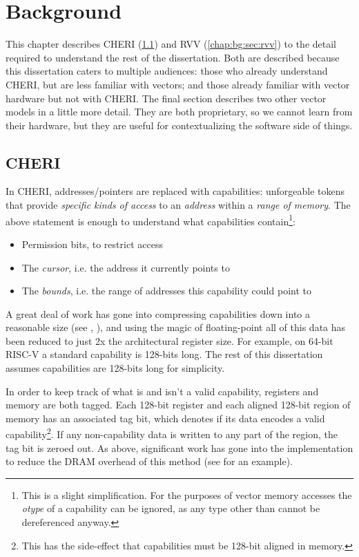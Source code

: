 \chapter{Background}

This chapter describes CHERI (\cref{chap:bg:sec:cheri}) and RVV (\cref{chap:bg:sec:rvv}) to the detail required to understand the rest of the dissertation.
Both are described because this dissertation caters to multiple audiences: those who already understand CHERI, but are less familiar with vectors; and those already familiar with vector hardware but not with CHERI.
The final section describes two other vector models in a little more detail.
They are both proprietary, so we cannot learn from their hardware, but they are useful for contextualizing the software side of things.


\section{CHERI}\label{chap:bg:sec:cheri}
In CHERI, addresses/pointers are replaced with capabilities: unforgeable tokens that provide \emph{specific kinds of access} to an \emph{address} within a \emph{range of memory}.
The above statement is enough to understand what capabilities contain\footnote{This is a slight simplification. For the purposes of vector memory accesses the \emph{otype} of a capability can be ignored, as any type other than  cannot be dereferenced anyway.}:
\begin{itemize}
    \item Permission bits, to restrict access
    \item The \emph{cursor}, i.e. the address it currently points to
    \item The \emph{bounds}, i.e. the range of addresses this capability could point to
\end{itemize}
A great deal of work has gone into compressing capabilities down into a reasonable size (see \cite{woodruffCHERIConcentratePractical2019}, ), and using the magic of floating-point all of this data has been reduced to just 2x the architectural register size.
For example, on 64-bit RISC-V a standard capability is 128-bits long.
The rest of this dissertation assumes capabilities are 128-bits long for simplicity.

In order to keep track of what is and isn't a valid capability, registers and memory are both tagged.
Each 128-bit register and each aligned 128-bit region of memory has an associated tag bit, which denotes if its data encodes a valid capability\footnote{This has the side-effect that capabilities must be 128-bit aligned in memory.}.
If any non-capability data is written to any part of the region, the tag bit is zeroed out.
As above, significant work has gone into the implementation to reduce the DRAM overhead of this method (see \cite{joannouEfficientTaggedMemory2017} for an example).


